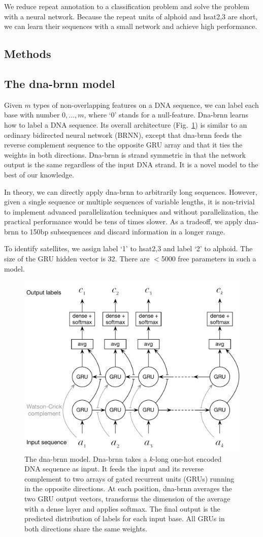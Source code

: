 \documentclass{bioinfo}
\begin{document}
We reduce repeat annotation to a classification problem and solve the problem
with a neural network. Because the repeat units of alphoid and hsat2,3 are
short, we can learn their sequences with a small network and achieve high
performance.

\begin{methods}
\section{Methods}

\subsection{The dna-brnn model}

Given $m$ types of non-overlapping features on a DNA sequence, we can label
each base with number $0,\ldots,m$, where `0' stands for a null-feature.
\mbox{Dna-brnn} learns how to label a DNA sequence. Its overall architecture
(Fig.~\ref{fig:model}) is similar to an ordinary bidirected neural network
(BRNN), except that \mbox{dna-brnn} feeds the reverse complement sequence to the
opposite GRU array and that it ties the weights in both directions. Dna-brnn is
strand symmetric in that the network output is the same regardless of the input
DNA strand. It is a novel model to the best of our knowledge.

In theory, we can directly apply dna-brnn to arbitrarily long sequences.
However, given a single sequence or multiple sequences of variable lengths, it
is non-trivial to implement advanced parallelization techniques and without
parallelization, the practical performance would be tens of times slower. As a
tradeoff, we apply dna-brnn to 150bp subsequences and discard information in a
longer range.

To identify satellites, we assign label `1' to hsat2,3 and label `2' to
alphoid. The size of the GRU hidden vector is 32. There are $<$5000 free
parameters in such a model.

\begin{figure}[tb]
\includegraphics[width=.49\textwidth]{dna-nn-fig}
\caption{The dna-brnn model. Dna-brnn takes a $k$-long one-hot encoded DNA
sequence as input. It feeds the input and its reverse complement to two arrays
of gated recurrent units (GRUs) running in the opposite directions. At each
position, dna-brnn averages the two GRU output vectors, transforms the
dimension of the average with a dense layer and applies softmax. The final
output is the predicted distribution of labels for each input base. All GRUs in
both directions share the same weights.}\label{fig:model}
\end{figure}


\end{methods}
\end{document}
